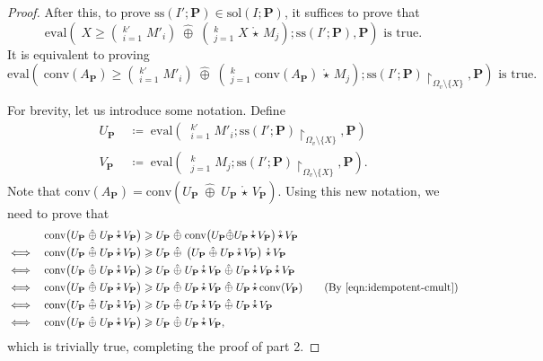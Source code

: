 \documentclass[10pt]{amsart}
\theoremstyle{plain}
\theoremstyle{definition}
\providecommand{\bP}[0]{\ensuremath{\mathbf P}\xspace}
\let\geq\geqslant
\providecommand{\defeq}[0]{\ensuremath{\;\coloneqq\;}\xspace}
\providecommand{\cplus}[0]{\ensuremath{\hat{\oplus}}\xspace}
\providecommand{\cmult}[0]{\ensuremath{{\,\mathring{\star}\,}}\xspace}
\providecommand{\conv}[1]{\ensuremath{\mathrm{conv}{\left({#1}\right)}\xspace}}
\providecommand{\sol}{\ensuremath{\mathrm{sol}}\xspace}
\providecommand{\ssol}{\ensuremath{\mathrm{ss}}\xspace}
\providecommand{\evalmap}[0]{\ensuremath{\mathrm{eval}}\xspace}
\begin{document}
\begin{proof}
    
    After this, to prove $\ssol(I';\bP)\in\sol(I;\bP)$, it suffices to prove that
        $$\evalmap\left( \; X \geq \left(\mathop{\cplus}_{i=1}^{k'} M'_i\right) \;\cplus\; \left(\mathop{\cplus}_{j=1}^k X\cmult M_j\right) ; \ssol(I';\bP), \bP\right)\text{ is true.}$$
    It is equivalent to proving
        $$\evalmap\left( \; \conv{A_\bP} \geq \left(\mathop{\cplus}_{i=1}^{k'} M'_i\right) \;\cplus\; \left(\mathop{\cplus}_{j=1}^k \conv{A_\bP}\cmult M_j\right) ; \ssol(I';\bP)\restriction_{\Omega_v \setminus \{X\}}, \bP\right)\text{ is true.} $$

    For brevity, let us introduce some notation. 
    Define
        \begin{align*}
            U_\bP &\defeq \evalmap\left( \; \mathop{\cplus}_{i=1}^{k'} M'_i ; \ssol(I';\bP)\restriction_{\Omega_v \setminus \{X\}}, \bP \right) \\
            V_\bP &\defeq \evalmap\left( \; \mathop{\cplus}_{j=1}^{k} M_j ; \ssol(I';\bP)\restriction_{\Omega_v \setminus \{X\}}, \bP \right).
        \end{align*}
    Note that $\conv{A_\bP} =\conv{U_\bP \;\cplus\; U_\bP\cmult V_\bP}$.
    Using this new notation, we need to prove that
        \begin{align*} 
            && \conv{U_\bP \;\cplus\; U_\bP\cmult V_\bP} &\geq U_\bP \;\cplus\; \conv{U_\bP \cplus U_\bP\cmult V_\bP}\cmult V_\bP\\
            \iff && \conv{U_\bP \;\cplus\; U_\bP\cmult V_\bP} &\geq U_\bP \;\cplus\; \left({U_\bP \;\cplus\; U_\bP\cmult V_\bP}\right)\cmult V_\bP\\
            \iff && \conv{U_\bP \;\cplus\; U_\bP\cmult V_\bP} &\geq U_\bP \;\cplus\; U_\bP\cmult V_\bP  \;\cplus\; U_\bP\cmult V_\bP\cmult V_\bP \\
            \iff && \conv{U_\bP \;\cplus\; U_\bP\cmult V_\bP} &\geq U_\bP \;\cplus\; U_\bP\cmult V_\bP  \;\cplus\; U_\bP\cmult \conv{V_\bP}
                \tag{By \eqref{eqn:idempotent-cmult}}\\ 
            \iff && \conv{U_\bP \;\cplus\; U_\bP\cmult V_\bP} &\geq U_\bP \;\cplus\; U_\bP\cmult V_\bP  \;\cplus\; U_\bP\cmult {V_\bP} \\
            \iff && \conv{U_\bP \;\cplus\; U_\bP\cmult V_\bP} &\geq U_\bP \;\cplus\; U_\bP\cmult V_\bP,  
        \end{align*}
    which is trivially true, completing the proof of part 2.
\end{proof}
\end{document}
